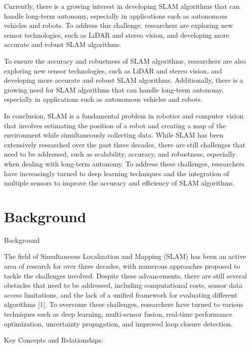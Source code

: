 \documentclass[conference]{IEEEtran}
\begin{document}
Currently, there is a growing interest in developing SLAM algorithms that can handle long-term autonomy, especially in applications such as autonomous vehicles and robots. To address this challenge, researchers are exploring new sensor technologies, such as LiDAR and stereo vision, and developing more accurate and robust SLAM algorithms.

To ensure the accuracy and robustness of SLAM algorithms, researchers are also exploring new sensor technologies, such as LiDAR and stereo vision, and developing more accurate and robust SLAM algorithms. Additionally, there is a growing need for SLAM algorithms that can handle long-term autonomy, especially in applications such as autonomous vehicles and robots.

In conclusion, SLAM is a fundamental problem in robotics and computer vision that involves estimating the position of a robot and creating a map of the environment while simultaneously collecting data. While SLAM has been extensively researched over the past three decades, there are still challenges that need to be addressed, such as scalability, accuracy, and robustness, especially when dealing with long-term autonomy. To address these challenges, researchers have increasingly turned to deep learning techniques and the integration of multiple sensors to improve the accuracy and efficiency of SLAM algorithms.

\section{Background}
Background

The field of Simultaneous Localization and Mapping (SLAM) has been an active area of research for over three decades, with numerous approaches proposed to tackle the challenges involved. Despite these advancements, there are still several obstacles that need to be addressed, including computational costs, sensor data access limitations, and the lack of a unified framework for evaluating different algorithms [1]. To overcome these challenges, researchers have turned to various techniques such as deep learning, multi-sensor fusion, real-time performance optimization, uncertainty propagation, and improved loop closure detection.

Key Concepts and Relationships:
\end{document}
